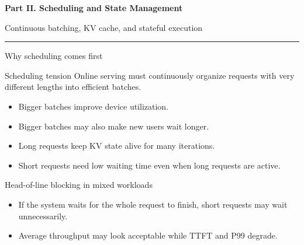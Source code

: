 \documentclass[aspectratio=169,11pt]{beamer}
\newcommand{\topicsectionpage}[2]{%
  \begin{frame}[plain]
    \vspace{1.0cm}
    {\huge\bfseries\textcolor{HUSTBlue}{#1}}\par
    \vspace{0.26cm}
    {\large\textcolor{HUSTGray}{#2}}\par
    \vfill
    \textcolor{HUSTLine}{\rule{0.76\paperwidth}{0.8pt}}
  \end{frame}
}
\begin{document}
\topicsectionpage{Part II. Scheduling and State Management}{Continuous batching, KV cache, and stateful execution}

\begin{frame}{Why scheduling comes first}
  \begin{block}{Scheduling tension}
    Online serving must continuously organize requests with very different lengths into efficient batches.
  \end{block}
  \begin{itemize}
    \item Bigger batches improve device utilization.
    \item Bigger batches may also make new users wait longer.
    \item Long requests keep KV state alive for many iterations.
    \item Short requests need low waiting time even when long requests are active.
  \end{itemize}
\end{frame}

\begin{frame}{Head-of-line blocking in mixed workloads}
  \centering
  \vspace{0.3cm}
  \begin{itemize}
    \item If the system waits for the whole request to finish, short requests may wait unnecessarily.
    \item Average throughput may look acceptable while TTFT and P99 degrade.
  \end{itemize}
\end{frame}
\end{document}
